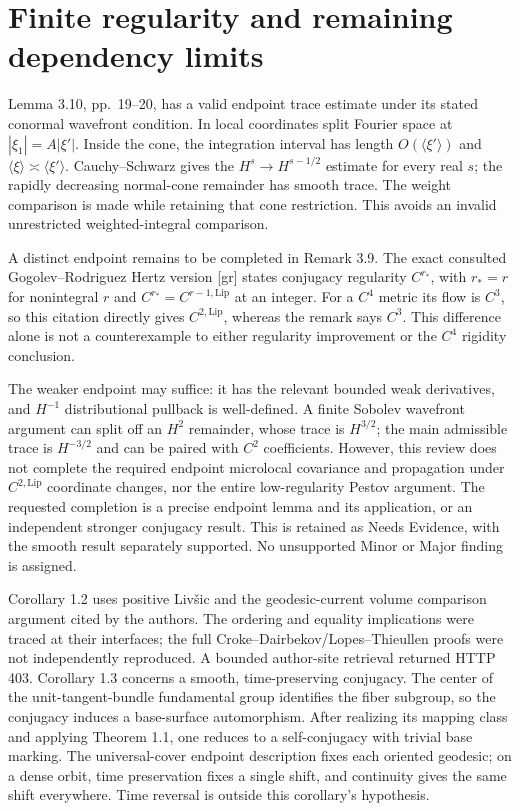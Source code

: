 \documentclass[10pt]{article}
\begin{document}
\section*{Finite regularity and remaining dependency limits}
Lemma 3.10, pp. 19–20, has a valid endpoint trace estimate under its stated conormal wavefront condition. In local coordinates split Fourier space at \(|\xi_1|=A|\xi'|\). Inside the cone, the integration interval has length \(O(\langle\xi'\rangle)\) and \(\langle\xi\rangle\asymp\langle\xi'\rangle\). Cauchy–Schwarz gives the \(H^s\to H^{s-1/2}\) estimate for every real \(s\); the rapidly decreasing normal-cone remainder has smooth trace. The weight comparison is made while retaining that cone restriction. This avoids an invalid unrestricted weighted-integral comparison.\par
A distinct endpoint remains to be completed in Remark 3.9. The exact consulted Gogolev–Rodriguez Hertz version [gr] states conjugacy regularity \(C^{r_*}\), with \(r_*=r\) for nonintegral \(r\) and \(C^{r_*}=C^{r-1,\mathrm{Lip}}\) at an integer. For a \(C^4\) metric its flow is \(C^3\), so this citation directly gives \(C^{2,\mathrm{Lip}}\), whereas the remark says \(C^3\). This difference alone is not a counterexample to either regularity improvement or the \(C^4\) rigidity conclusion.\par
The weaker endpoint may suffice: it has the relevant bounded weak derivatives, and \(H^{-1}\) distributional pullback is well-defined. A finite Sobolev wavefront argument can split off an \(H^2\) remainder, whose trace is \(H^{3/2}\); the main admissible trace is \(H^{-3/2}\) and can be paired with \(C^2\) coefficients. However, this review does not complete the required endpoint microlocal covariance and propagation under \(C^{2,\mathrm{Lip}}\) coordinate changes, nor the entire low-regularity Pestov argument. The requested completion is a precise endpoint lemma and its application, or an independent stronger conjugacy result. This is retained as Needs Evidence, with the smooth result separately supported. No unsupported Minor or Major finding is assigned.\par
Corollary 1.2 uses positive Livšic and the geodesic-current volume comparison argument cited by the authors. The ordering and equality implications were traced at their interfaces; the full Croke–Dairbekov/Lopes–Thieullen proofs were not independently reproduced. A bounded author-site retrieval returned HTTP 403. Corollary 1.3 concerns a smooth, time-preserving conjugacy. The center of the unit-tangent-bundle fundamental group identifies the fiber subgroup, so the conjugacy induces a base-surface automorphism. After realizing its mapping class and applying Theorem 1.1, one reduces to a self-conjugacy with trivial base marking. The universal-cover endpoint description fixes each oriented geodesic; on a dense orbit, time preservation fixes a single shift, and continuity gives the same shift everywhere. Time reversal is outside this corollary’s hypothesis.\par
\end{document}
